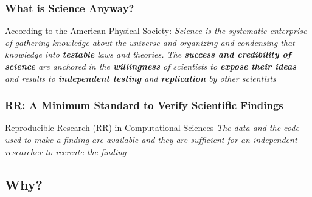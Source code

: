 \documentclass[10pt]{beamer}\usepackage[]{graphicx}\usepackage[]{color}
\begin{document}
\begin{frame}

\frametitle{What is Science Anyway?}

\pause
\begin{block}{According to the American Physical Society:}
\emph{Science is the systematic enterprise of gathering knowledge about the universe and organizing and condensing that knowledge into \textbf{testable} laws and theories. The \textbf{success and credibility of science} are anchored in the \textbf{willingness} of scientists to \textbf{expose their ideas} and results to \textbf{independent testing} and \textbf{replication} by other scientists}
\end{block}

\end{frame}

\begin{frame}

\frametitle{RR: A Minimum Standard to Verify Scientific Findings}

\pause
\begin{block}{Reproducible Research (RR) in Computational Sciences}
\emph{The data and the code used to make a finding are available and they are sufficient for an independent researcher to recreate the finding}
\end{block}

\end{frame}


\subsection{Why?}
\end{document}

